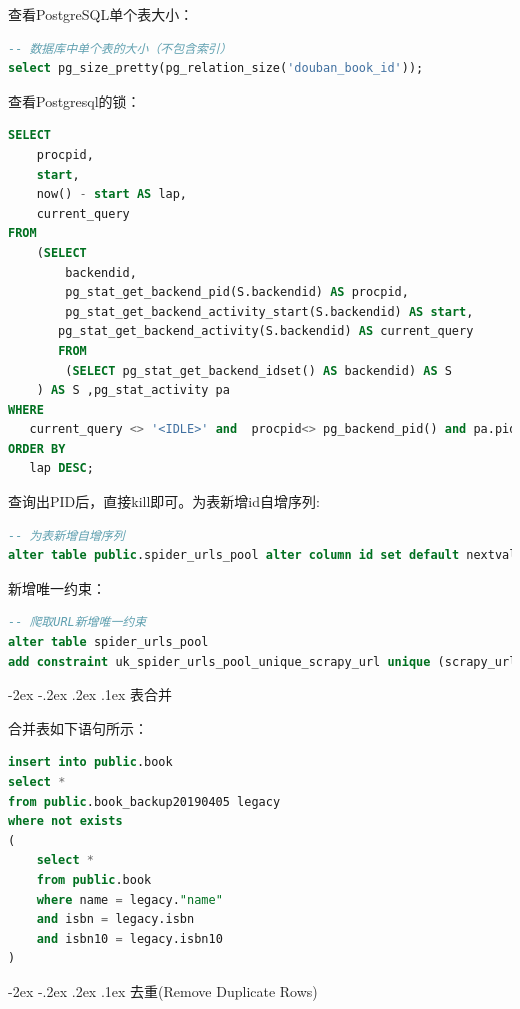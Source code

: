\documentclass[8pt]{book}
\makeatletter
\numberwithin{dummy}{section}
\theoremstyle{ocrenumbox}
\theoremstyle{blacknumex}
\theoremstyle{blacknumbox}
\theoremstyle{ocrenum}
\renewcommand\paragraph{\@startsection{paragraph}{4}{\z@}
	{-2ex \@plus-.2ex \@minus .2ex}
	{.1ex}
	{\normalfont\small\sffamily\bfseries}}
\makeatother
\begin{document}
查看PostgreSQL单个表大小：

\begin{lstlisting}[language=SQL]
-- 数据库中单个表的大小（不包含索引）
select pg_size_pretty(pg_relation_size('douban_book_id'));
\end{lstlisting}

查看Postgresql的锁：

\begin{lstlisting}[language=SQL]
SELECT   
    procpid,   
    start,   
    now() - start AS lap,   
    current_query   
FROM   
    (SELECT   
        backendid,   
        pg_stat_get_backend_pid(S.backendid) AS procpid,   
        pg_stat_get_backend_activity_start(S.backendid) AS start,   
       pg_stat_get_backend_activity(S.backendid) AS current_query   
       FROM   
        (SELECT pg_stat_get_backend_idset() AS backendid) AS S   
    ) AS S ,pg_stat_activity pa  
WHERE   
   current_query <> '<IDLE>' and  procpid<> pg_backend_pid() and pa.pid=s.procpid and pa.state<>'idle'  
ORDER BY   
   lap DESC;
\end{lstlisting}

查询出PID后，直接kill即可。为表新增id自增序列:

\begin{lstlisting}[language=SQL]
-- 为表新增自增序列
alter table public.spider_urls_pool alter column id set default nextval('public.scrapy_urls_id_seq');
\end{lstlisting}

新增唯一约束：

\begin{lstlisting}[language=SQL]
-- 爬取URL新增唯一约束
alter table spider_urls_pool 
add constraint uk_spider_urls_pool_unique_scrapy_url unique (scrapy_url);
\end{lstlisting}

\paragraph{表合并}


合并表如下语句所示：

\begin{lstlisting}[language=SQL]
insert into public.book
select *
from public.book_backup20190405 legacy
where not exists 
(
    select *
    from public.book
    where name = legacy."name"
    and isbn = legacy.isbn
    and isbn10 = legacy.isbn10
)
\end{lstlisting}


\paragraph{去重(Remove Duplicate Rows)}
\end{document}
